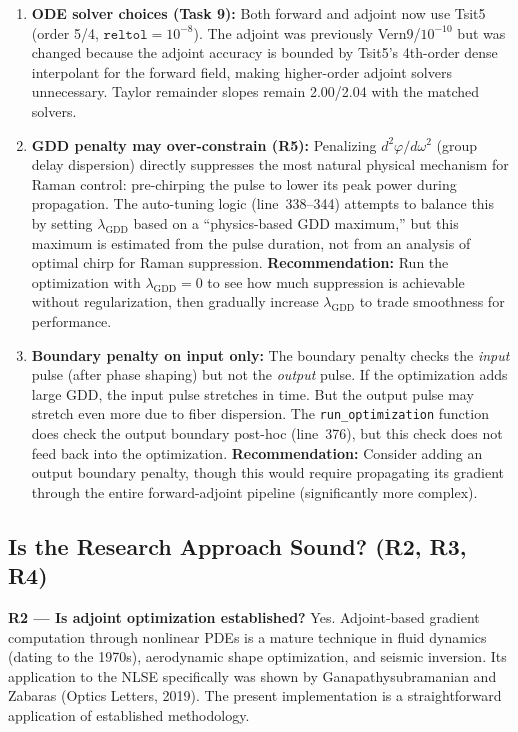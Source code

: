 \documentclass[12pt,a4paper]{article}
\theoremstyle{definition}
\begin{document}
\begin{enumerate}[leftmargin=*]
\item \textbf{ODE solver choices (Task 9):} Both forward and adjoint now use Tsit5 (order 5/4, $\texttt{reltol}=10^{-8}$). The adjoint was previously Vern9/$10^{-10}$ but was changed because the adjoint accuracy is bounded by Tsit5's 4th-order dense interpolant for the forward field, making higher-order adjoint solvers unnecessary. Taylor remainder slopes remain 2.00/2.04 with the matched solvers.

\item \textbf{GDD penalty may over-constrain (R5):} Penalizing $d^2\varphi/d\omega^2$ (group delay dispersion) directly suppresses the most natural physical mechanism for Raman control: pre-chirping the pulse to lower its peak power during propagation. The auto-tuning logic (line~338--344) attempts to balance this by setting $\lambda_{\text{GDD}}$ based on a ``physics-based GDD maximum,'' but this maximum is estimated from the pulse duration, not from an analysis of optimal chirp for Raman suppression. \textbf{Recommendation:} Run the optimization with $\lambda_{\text{GDD}} = 0$ to see how much suppression is achievable without regularization, then gradually increase $\lambda_{\text{GDD}}$ to trade smoothness for performance.

\item \textbf{Boundary penalty on input only:} The boundary penalty checks the \emph{input} pulse (after phase shaping) but not the \emph{output} pulse. If the optimization adds large GDD, the input pulse stretches in time. But the output pulse may stretch even more due to fiber dispersion. The \texttt{run\_optimization} function does check the output boundary post-hoc (line~376), but this check does not feed back into the optimization. \textbf{Recommendation:} Consider adding an output boundary penalty, though this would require propagating its gradient through the entire forward-adjoint pipeline (significantly more complex).
\end{enumerate}

\subsection{Is the Research Approach Sound? (R2, R3, R4)}

\textbf{R2 --- Is adjoint optimization established?} Yes. Adjoint-based gradient computation through nonlinear PDEs is a mature technique in fluid dynamics (dating to the 1970s), aerodynamic shape optimization, and seismic inversion. Its application to the NLSE specifically was shown by Ganapathysubramanian and Zabaras (Optics Letters, 2019). The present implementation is a straightforward application of established methodology.
\end{document}
